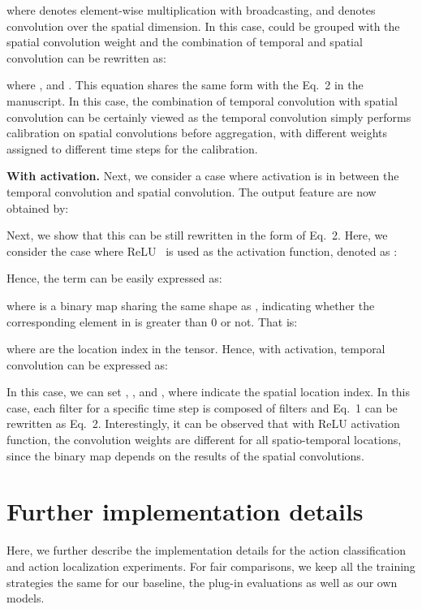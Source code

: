 \documentclass[10pt,journal,compsoc]{IEEEtran}
\begin{document}
\noindent where  denotes element-wise multiplication with broadcasting, and  denotes convolution over the spatial dimension. 
In this case,  could be grouped with the spatial convolution weight  and the combination of temporal and spatial convolution can be rewritten as:

\noindent where ,  and . 
This equation shares the same form with the Eq.~{\color{forestgreen}2} in the manuscript.
In this case, the combination of temporal convolution with spatial convolution can be certainly viewed as the temporal convolution simply performs calibration on spatial convolutions before aggregation, with different weights assigned to different time steps for the calibration. 

\textbf{With activation.} Next, we consider a case where activation is in between the temporal convolution and spatial convolution. The output feature  are now obtained by:


Next, we show that this can be still rewritten in the form of Eq.~{\color{forestgreen}2}. Here, we consider the case where ReLU~\cite{relu} is used as the activation function, denoted as :

Hence, the term  can be easily expressed as:

\noindent where  is a binary map sharing the same shape as , indicating whether the corresponding element in  is greater than 0 or not. That is:

\noindent where  are the location index in the tensor.
Hence, with activation, temporal convolution can be expressed as:

\noindent In this case, we can set , , and , where  indicate the spatial location index.
In this case, each filter for a specific time step  is composed of  filters and Eq.~{\color{forestgreen}1} can be rewritten as Eq.~{\color{forestgreen}2}. 
Interestingly, it can be observed that with ReLU activation function, the convolution weights are different for all spatio-temporal locations, since the binary map  depends on the results of the spatial convolutions. 


\section{Further implementation details}
\label{appendix:implementationdetails}
Here, we further describe the implementation details for the action classification and action localization experiments.
For fair comparisons, we keep all the training strategies the same for our baseline, the plug-in evaluations as well as our own models.
\end{document}
